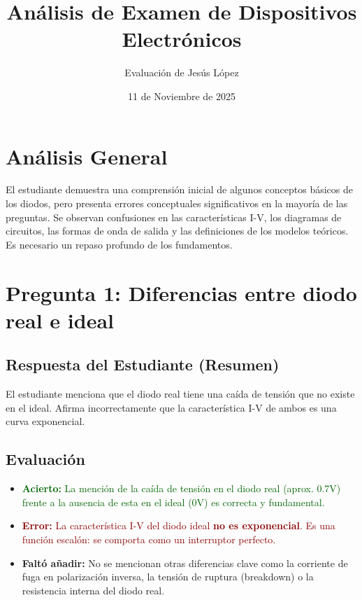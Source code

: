 \documentclass[12pt, a4paper]{article}
\newcommand{\acierto}[1]{\textcolor{darkgreen}{\textbf{Acierto:} #1}}
\newcommand{\error}[1]{\textcolor{darkred}{\textbf{Error:} #1}}
\newcommand{\faltante}[1]{\textcolor{blue!70!black}{\textbf{Faltó añadir:} #1}}
\begin{document}
\title{Análisis de Examen de Dispositivos Electrónicos}
\author{Evaluación de Jesús López}
\date{11 de Noviembre de 2025}
\maketitle

\section*{Análisis General}
El estudiante demuestra una comprensión inicial de algunos conceptos básicos de los diodos, pero presenta errores conceptuales significativos en la mayoría de las preguntas. Se observan confusiones en las características I-V, los diagramas de circuitos, las formas de onda de salida y las definiciones de los modelos teóricos. Es necesario un repaso profundo de los fundamentos.

\hrulefill
\vspace{1cm}

\section{Pregunta 1: Diferencias entre diodo real e ideal}

\subsection*{Respuesta del Estudiante (Resumen)}
El estudiante menciona que el diodo real tiene una caída de tensión que no existe en el ideal. Afirma incorrectamente que la característica I-V de ambos es una curva exponencial.

\subsection*{Evaluación}
\begin{itemize}
    \item \acierto{La mención de la caída de tensión en el diodo real (aprox. 0.7V) frente a la ausencia de esta en el ideal (0V) es correcta y fundamental.}
    \item \error{La característica I-V del diodo ideal \textbf{no es exponencial}. Es una función escalón: se comporta como un interruptor perfecto.}
    \item \faltante{No se mencionan otras diferencias clave como la corriente de fuga en polarización inversa, la tensión de ruptura (breakdown) o la resistencia interna del diodo real.}
\end{itemize}
\end{document}
